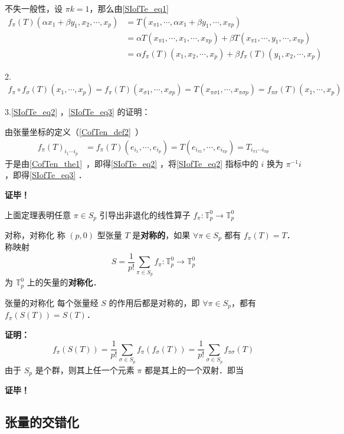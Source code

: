 不失一般性，设 $\pi k=1$，那么由\autoref{SIofTe_eq1} 
\begin{equation}
\begin{aligned}
f_\pi(T)(\alpha x_1+\beta y_1,x_2,\cdots,x_p)&=T(x_{\pi1},\cdots,\alpha x_1+\beta y_1,\cdots,x_{\pi p})\\
&=\alpha T(x_{\pi1},\cdots,x_1,\cdots,x_{\pi p})+\beta T(x_{\pi1},\cdots,y_1,\cdots,x_{\pi p})\\
&=\alpha f_{\pi}(T)(x_1,x_2,\cdots,x_p)+\beta f_{\pi}(T)(y_1,x_2,\cdots,x_p)
\end{aligned}
\end{equation}

2.\begin{equation}
\begin{aligned}
f_\pi\circ f_\sigma(T)(x_1,\cdots,x_p)=f_\pi(T)(x_{\sigma1},\cdots,x_{\sigma p})=T(x_{\pi\sigma1},\cdots,x_{\pi\sigma p})=f_{\pi\sigma}(T)(x_1,\cdots,x_p)
\end{aligned}
\end{equation}


3.\autoref{SIofTe_eq2} ，\autoref{SIofTe_eq3} 的证明：

由张量坐标的定义（\autoref{CofTen_def2}~）
\begin{equation}
\begin{aligned}
f_{\pi}(T)_{i_1\cdots i_p}&=f_{\pi}(T)(e_{i_1},\cdots,e_{i_p})=T(e_{i_{\pi1}},\cdots,e_{i_{\pi p}})=T_{i_{\pi1}\cdots i_{\pi p}}
\end{aligned}
\end{equation}
于是由\autoref{CofTen_the1}~，即得\autoref{SIofTe_eq2} ，将\autoref{SIofTe_eq2} 指标中的 $i$ 换为  $\pi^{-1} i$，即得\autoref{SIofTe_eq3} ．

\textbf{证毕！}

上面定理表明任意 $\pi \in S_p$ 引导出非退化的线性算子 $f_\pi:\mathbb{T}_p^0\rightarrow\mathbb{T}_p^0$ 

\begin{definition}{对称，对称化}
称 $(p,0)$ 型张量 $T$ 是\textbf{对称的}，如果 $\forall \pi\in S_p$ 都有 $f_{\pi}(T)=T$．称映射 
\begin{equation}
S=\frac{1}{p!}\sum_{\pi\in S_p} f_\pi:\mathbb{T}_p^0\rightarrow\mathbb{T}_p^0
\end{equation}
为 $\mathbb{T}_p^0$ 上的矢量的\textbf{对称化}．
\end{definition}

\begin{theorem}{张量的对称化}
每个张量经 $S$ 的作用后都是对称的，即 $\forall \pi\in S_p$，都有 $f_\pi(S(T))=S(T)$．
\end{theorem}
\textbf{证明：}
\begin{equation}
f_\pi(S(T))=\frac{1}{p!}\sum_{\sigma\in S_p} f_\pi(f_\sigma(T))=\frac{1}{p!}\sum_{\sigma\in S_p} f_{\pi\sigma}(T)
\end{equation}
由于 $S_p$ 是个群，则其上任一个元素 $\pi$ 都是其上的一个双射．即当 

\textbf{证毕！}
\subsection{张量的交错化}